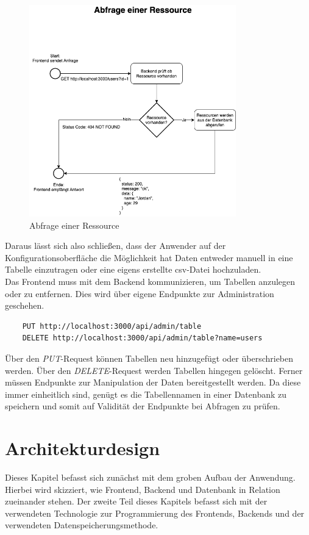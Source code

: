 \begin{figure}[h]
    \centering
    \includegraphics[width=0.8\textwidth]{figures/fc-abfrage-ressource.png}
    \caption{Abfrage einer Ressource}
    \label{fig:request-ressource}
\end{figure}
Daraus lässt sich also schließen, dass der Anwender auf der Konfigurationsoberfläche die Möglichkeit hat Daten entweder manuell in eine Tabelle einzutragen oder eine eigens erstellte \gls{csv}-Datei hochzuladen.
\\
Das Frontend muss mit dem Backend kommunizieren, um Tabellen anzulegen oder zu entfernen. Dies wird über eigene Endpunkte zur Administration geschehen. 

\begin{verbatim}
    PUT http://localhost:3000/api/admin/table
    DELETE http://localhost:3000/api/admin/table?name=users
\end{verbatim}
Über den \textit{PUT}-Request können Tabellen neu hinzugefügt oder überschrieben werden. Über den \textit{DELETE}-Request werden Tabellen hingegen gelöscht.
Ferner müssen Endpunkte zur Manipulation der Daten bereitgestellt werden. Da diese immer einheitlich sind, genügt es die Tabellennamen in einer Datenbank zu speichern und somit auf Validität der Endpunkte bei Abfragen zu prüfen.

\section{Architekturdesign} \label{sec:architecture}
Dieses Kapitel befasst sich zunächst mit dem groben Aufbau der Anwendung. Hierbei wird skizziert, wie Frontend, Backend und Datenbank in Relation zueinander stehen. Der zweite Teil dieses Kapitels befasst sich mit der verwendeten Technologie zur Programmierung des Frontends, Backends und der verwendeten Datenspeicherungsmethode.  

